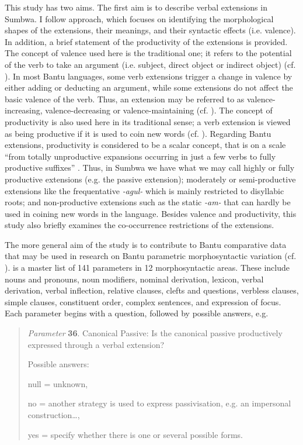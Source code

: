 \documentclass[output=paper		  ]{langscibook}
\begin{document}
{This study has two aims. The first aim is to describe verbal extensions in Sumbwa. I follow  approach, which focuses on identifying the morphological shapes of the extensions, their meanings, and their syntactic effects (i.e. valence). In addition, a brief statement of the productivity of the extensions is provided. The concept of valence used here is the traditional one; it refers to the potential of the verb to take an argument (i.e. subject, direct object or indirect object) (cf. \citealt{Humphreys1999, HaspelmathMüller-Bardey2004}). In most Bantu languages, some verb extensions trigger a change in valence by either adding or deducting an argument, while some extensions do not affect the basic valence of the verb. Thus, an extension may be referred to as valence-increasing, valence-decreasing or valence-maintaining (cf. \citealt{Chabata2007, Payne1997, Hyman2007}). The concept of productivity is also used here in its traditional sense; a verb extension is viewed as being productive if it is used to coin new words (cf. \citealt[121]{Plag2006}). Regarding Bantu extensions, productivity is considered to be a scalar concept, that is on a scale “from totally unproductive expansions occurring in just a few verbs to fully productive suffixes” \citep[73]{Schadeberg2003}. Thus, in Sumbwa we have what we may call highly or fully productive extensions (e.g. the passive extension); moderately or semi-productive extensions like the frequentative} {\textit{{}-agul-}} {which is} {mainly restricted to disyllabic roots; and non-productive extensions such as the static} {\textit{{}-am-}} {that can hardly be used in coining new words in the language. Besides valence and productivity, this study also briefly examines the co-occurrence restrictions of the extensions.} 

{The more general aim of the study is to contribute to Bantu comparative data that may be used in research on Bantu parametric morphosyntactic variation (cf. \citealt{MartenEtAl2007, GuéroisEtAl2017}). \citet{GuéroisEtAl2017} is a master list of 141 parameters in 12 morphosyntactic areas. These include nouns and pronouns, noun modifiers, nominal derivation, lexicon, verbal derivation, verbal inflection, relative clauses, clefts and questions, verbless clauses, simple clauses, constituent order, complex sentences, and expression of focus. Each parameter begins with a question, followed by possible answers, e.g.} 

\begin{quote}
{\textit{Parameter} \textbf{36}}{. Canonical Passive: Is the canonical passive productively expressed through a verbal extension?} 

{Possible answers:}

{null = unknown,} 

{no = another strategy is used to express passivisation, e.g. an impersonal construction…,} 

{yes = specify whether there is one or several possible forms.} 
\end{quote}
\end{document}
